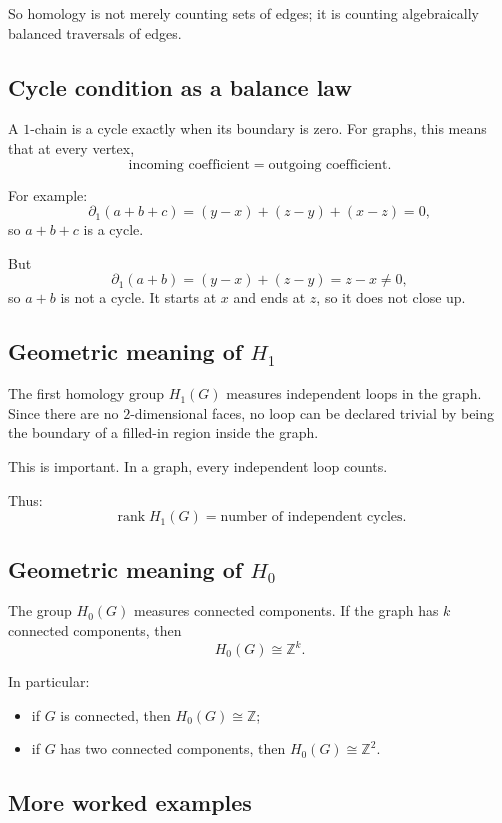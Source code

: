 \documentclass[12pt,a4paper]{article}
\theoremstyle{notespace}
\begin{document}
	So homology is not merely counting sets of edges; it is counting algebraically balanced traversals of edges.
	
	\subsection{Cycle condition as a balance law}
	
	A \(1\)-chain is a cycle exactly when its boundary is zero. For graphs, this means that at every vertex,
	\[
	\text{incoming coefficient} = \text{outgoing coefficient}.
	\]
	
	For example:
	\[
	\partial_1(a+b+c)=(y-x)+(z-y)+(x-z)=0,
	\]
	so \(a+b+c\) is a cycle.
	
	But
	\[
	\partial_1(a+b)=(y-x)+(z-y)=z-x\neq 0,
	\]
	so \(a+b\) is not a cycle. It starts at \(x\) and ends at \(z\), so it does not close up.
	
	\subsection{Geometric meaning of \(H_1\)}
	
	The first homology group \(H_1(G)\) measures independent loops in the graph. Since there are no \(2\)-dimensional faces, no loop can be declared trivial by being the boundary of a filled-in region inside the graph.
	
	This is important. In a graph, every independent loop counts.
	
	Thus:
	\[
	\operatorname{rank} H_1(G)=\text{number of independent cycles}.
	\]
	
	\subsection{Geometric meaning of \(H_0\)}
	
	The group \(H_0(G)\) measures connected components. If the graph has \(k\) connected components, then
	\[
	H_0(G)\cong \mathbb{Z}^k.
	\]
	
	In particular:
	\begin{itemize}[leftmargin=2em]
		\item if \(G\) is connected, then \(H_0(G)\cong \mathbb{Z}\);
		\item if \(G\) has two connected components, then \(H_0(G)\cong \mathbb{Z}^2\).
	\end{itemize}
	
	\subsection{More worked examples}
	
\end{document}
